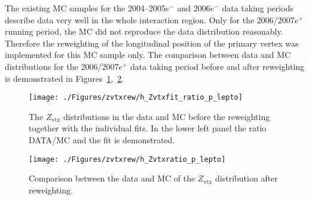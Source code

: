 The existing MC samples for the 2004--2005$e^-$ and 2006$e^-$ data taking periods describe data very well in the whole interaction region. Only for the 2006/2007$e^+$ running period, the MC did not reproduce the data distribution reasonably. Therefore the reweighting of the longitudinal position of the primary vertex was implemented for this MC sample only. The comparison between data and MC distributions for the 2006/2007$e^+$ data taking period before and after reweighting is demonstrated in Figures~\ref{fig:zvtxrew},~\ref{fig:zvtxrewaf}.
\begin{figure}[t]
\begin{center}
 \hspace{-35pt}\texttt{[image: ./Figures/zvtxrew/h\_Zvtxfit\_ratio\_p\_lepto]}%
\end{center}
\caption{The $Z_\text{vtx}$ distributions in the data and \lepto MC before the reweighting together with the individual fits. In the lower left panel the ratio DATA/MC and the fit is demonstrated.} 
\label{fig:zvtxrew}
\end{figure}

\begin{figure}[p]
\begin{center}
 \texttt{[image: ./Figures/zvtxrew/h\_Zvtxratio\_p\_lepto]}
\end{center}
\caption{Comparison between the data and \lepto MC of the $Z_\text{vtx}$ distribution after reweighting.} 
\label{fig:zvtxrewaf}
\end{figure}